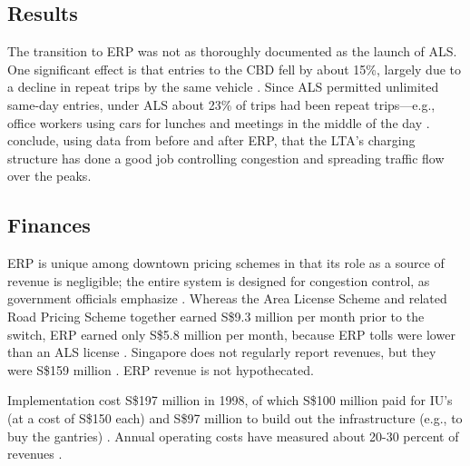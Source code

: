 \subsection{Results}

The transition to ERP was not as thoroughly documented as the launch of ALS. One significant effect is that entries to the CBD fell by about 15\%, largely due to a decline in repeat trips by the same vehicle \citep{Menon2000}. Since ALS permitted unlimited same-day entries, under ALS about 23\% of trips had been repeat trips---e.g., office workers using cars for lunches and meetings in the middle of the day \citep[p. 23]{Chin2010}. \citet{Olszewski2005} conclude, using data from before and after ERP, that the LTA's charging structure has done a good job controlling congestion and spreading traffic flow over the peaks.

\subsection{Finances}

ERP is unique among downtown pricing schemes in that its role as a source of revenue is negligible; the entire system is designed for congestion control, as government officials emphasize \citep{Chin2010}. Whereas the Area License Scheme and related Road Pricing Scheme together earned S\$9.3 million per month prior to the switch, ERP earned only S\$5.8 million per month, because ERP tolls were lower than an ALS license \citep[p. 34]{Goh2002}. Singapore does not regularly report revenues, but they were S\$159 million \citep{Chen2012}. ERP revenue is not hypothecated.

Implementation cost S\$197 million in 1998, of which S\$100 million paid for IU's (at a cost of S\$150 each) and S\$97 million to build out the infrastructure (e.g., to buy the gantries) \citep{Santos2004}. Annual operating costs have measured about 20-30 percent of revenues \citep{Chin2010}.